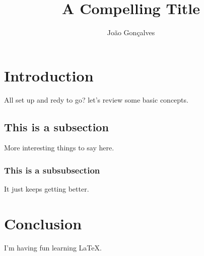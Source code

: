 \documentclass{article}
\title{A Compelling Title}
\author{João Gonçalves}
\begin{document}
\maketitle

\section{Introduction}

All set up and redy to go? let's review some basic concepts.

\subsection{This is a subsection}

More interesting things to say here.

\subsubsection{This is a subsubsection}

It just keeps getting better.

\section{Conclusion}

I'm having fun learning \LaTeX.
\end{document}
